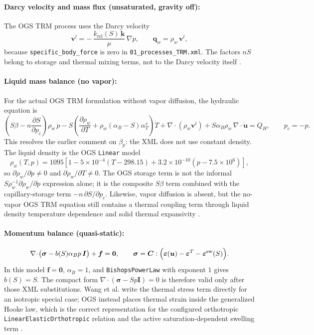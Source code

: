 \documentclass[10pt,a4paper]{article}
\newcommand{\uu}{\bm{u}}
\newcommand{\sig}{\bm{\sigma}}
\newcommand{\I}{\bm{I}}
\newcommand{\grad}{\nabla}
\newcommand{\divv}{\nabla\!\cdot}
\newcommand{\TT}{T}
\newcommand{\pp}{p}
\newcommand{\rhoW}{\rho_w}
\newcommand{\muW}{\mu}
\newcommand{\npor}{n}
\newcommand{\Sat}{S}
\newcommand{\alphaB}{\alpha_B}
\newcommand{\pcap}{p_c}
\newcommand{\vW}{\bm v^l}
\newcommand{\kperm}{\bm{k}}
\newcommand{\krel}{k_{\mathrm{rel}}(\Sat)}
\newcommand{\qW}{\bm{q}_w}
\begin{document}
\paragraph{Darcy velocity and mass flux (unsaturated, gravity off):}
The OGS TRM process uses the Darcy velocity
\[
\vW = -\,\frac{\krel\,\kperm}{\muW}\,\grad \pp,
\qquad
\qW = \rhoW\,\vW ,
\]
because \texttt{specific\_body\_force} is zero in \texttt{01\_processes\_TRM.xml}.
The factors \(\npor\Sat\) belong to storage and thermal mixing terms, not to the Darcy
velocity itself \cite[Sec.~``Governing equations without vapor diffusion'']{OpenGeoSysTRMDocs}.

\paragraph{Liquid mass balance (no vapor):}
For the actual OGS TRM formulation without vapor diffusion, the hydraulic equation is
\[
\left(\Sat\beta-\npor\frac{\partial \Sat}{\partial \pcap}\right)\rhoW\,\dot{\pp}
- \Sat\left(
      \frac{\partial \rhoW}{\partial \TT}
      + \rhoW(\alphaB-\Sat)\alpha_T^s
  \right)\dot{\TT}
+ \divv(\rhoW\vW)
+ \Sat\alphaB\rhoW\,\divv\dot{\uu}
= Q_H ,
\qquad \pcap=-\pp .
\]
This resolves the earlier comment on \(\beta_p\): the XML does not use constant density.
The liquid density is the OGS \texttt{Linear} model
\[
\rhoW(\TT,\pp)
=1095\left[1-5\times10^{-4}(\TT-298.15)
+3.2\times10^{-10}(\pp-7.5\times10^6)\right],
\]
so \(\partial\rhoW/\partial\pp\neq0\) and
\(\partial\rhoW/\partial\TT\neq0\).  The OGS storage term is not the informal
\(\Sat\rhoW^{-1}\partial\rhoW/\partial\pp\) expression alone; it is the composite
\(\Sat\beta\) term combined with the capillary-storage term
\(-\npor\,\partial \Sat/\partial \pcap\).  Likewise, vapor diffusion is absent, but
the no-vapor OGS TRM equation still contains a thermal coupling term through liquid
density temperature dependence and solid thermal expansivity
\cite[pp.~1633--1634]{Wang2009THM}
\cite[Sec.~``Governing equations without vapor diffusion'']{OpenGeoSysTRMDocs}.

\paragraph{Momentum balance (quasi-static):}
\[
\divv\!\bigl(\sig - b(\Sat)\alphaB\pp\,\I\bigr)+\bm f=\bm{0},
\qquad
\sig=\bm{C}:\Big(\bm{\varepsilon}(\uu)-\bm{\varepsilon}^{T}
-\bm{\varepsilon}^{\rm sw}(\Sat)\Big).
\]
In this model \(\bm f=\bm0\), \(\alphaB=1\), and
\texttt{BishopsPowerLaw} with exponent \(1\) gives \(b(\Sat)=\Sat\).
The compact form \(\divv(\sig-\Sat\pp\I)=0\) is therefore valid only after those
XML substitutions.  Wang et al. write the thermal stress term directly for an
isotropic special case; OGS instead places thermal strain inside the generalized
Hooke law, which is the correct representation for the configured orthotropic
\texttt{LinearElasticOrthotropic} relation and the active saturation-dependent swelling
term \cite[pp.~1633--1634]{Wang2009THM}
\cite[Sec.~``Governing equations without vapor diffusion'']{OpenGeoSysTRMDocs}.
\end{document}
